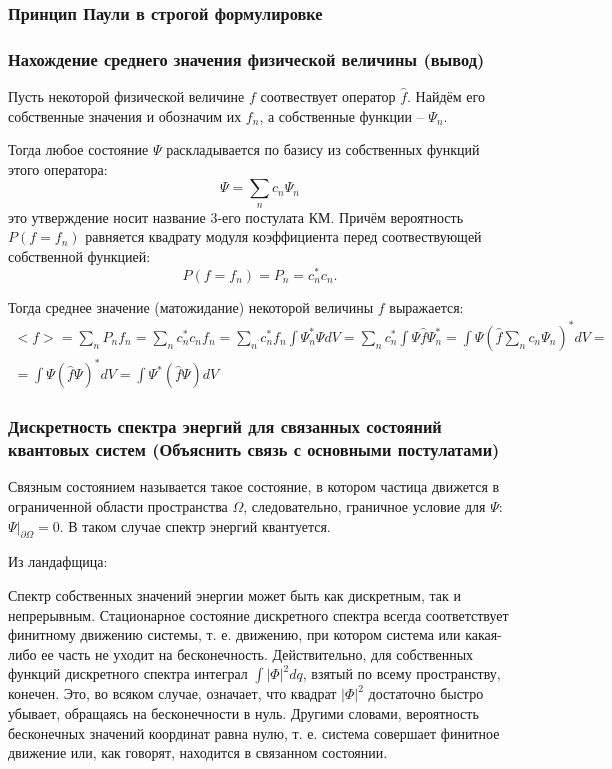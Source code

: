 \subsubsection{Принцип Паули в строгой формулировке}



\subsubsection{Нахождение среднего значения физической величины (вывод)}

Пусть некоторой физической величине $f$ соотвествует оператор $\hat{f}$. Найдём его собственные значения и обозначим их $f_n$, а собственные функции -- $\Psi_n$.

Тогда любое состояние $\Psi$ раскладывается по базису из собственных функций этого оператора:
\[
  \Psi = \sum_n c_n \Psi_n
\]
это утверждение носит название 3-его постулата КМ. Причём вероятность $P(f = f_n)$ равняется квадрату модуля коэффициента перед соотвествующей собственной функцией:
\[
  P(f = f_n) = P_n = c_n^* c_n.
\]

Тогда среднее значение (матожидание) некоторой величины $f$ выражается:
\begin{multline*}
  <f> = \sum_n P_n f_n
  = \sum_n c_n^* c_n f_n
  = \sum_n c_n^* f_n \int \Psi_n^* \Psi dV
  = \sum_n c_n^* \int \Psi \hat{f} \Psi_n^*
  = \int \Psi (\hat{f} \sum_n c_n \Psi_n)^* dV = \\
  = \int \Psi (\hat{f} \Psi)^* dV
  = \int \Psi^* (\hat{f} \Psi) dV
\end{multline*}

\subsubsection{Дискретность спектра энергий для связанных состояний квантовых систем
(Объяснить связь с основными постулатами)}

Связным состоянием называется такое состояние, в котором частица движется в ограниченной области
пространства $\Omega$, следовательно, граничное условие для $\Psi$:
$\left. \Psi \right|_{\partial \Omega} = 0$. В таком случае спектр энергий квантуется.

Из ландафщица:

Спектр собственных значений энергии может быть как дискретным, так и непрерывным.
Стационарное состояние дискретного спектра всегда соответствует финитному движению
системы, т. е. движению, при котором система или какая-либо ее часть не уходит на
бесконечность. Действительно, для собственных функций дискретного спектра интеграл
$\int |\Phi|^2 dq$, взятый по всему пространству, конечен. Это, во всяком случае,
означает, что квадрат $|\Phi|^2$ достаточно быстро убывает, обращаясь на бесконечности в
нуль. Другими словами, вероятность бесконечных значений координат равна нулю, т. е.
система совершает финитное движение или, как говорят, находится в связанном состоянии.


